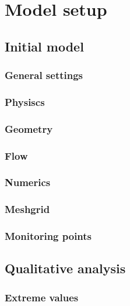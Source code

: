 \chapter{Model setup}\label{model-setup}

\section{Initial model}\label{initial-model}

\subsection{General settings}\label{general-settings}

\subsection{Physiscs}\label{physiscs}

\subsection{Geometry}\label{geometry}

\subsection{Flow}\label{flow}

\subsection{Numerics}\label{numerics}

\subsection{Meshgrid}\label{meshgrid}

\subsection{Monitoring points}\label{monitoring-points}

\section{Qualitative analysis}\label{qualitative-analysis}

\subsection{Extreme values}\label{extreme-values}

